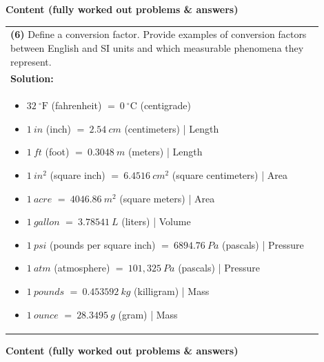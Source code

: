 \documentclass{article}
\begin{document}
\newpage
\noindent
{\large \textbf{Content (fully worked out problems \& answers)}} \\[0.2em]

\begin{tabular}{|p{0.9\linewidth}|}
\hline
\textbf{(6)} Define a conversion factor. Provide examples of conversion factors between English and SI units and which measurable phenomena they represent. \\
\textbf{Solution:} \\
\begin{itemize}
    \item $32~^\circ\mathrm{F}$ (fahrenheit) $=~0~^\circ\mathrm{C}$ (centigrade)
    \item $1~in$ (inch) $=~2.54~cm$ (centimeters) | Length
    \item $1~ft$ (foot) $=~0.3048~m$ (meters) | Length
    \item $1~in^2$ (square inch) $=~6.4516~cm^2$ (square centimeters) | Area
    \item $1~acre$ $=~4046.86~m^2$ (square meters) | Area
    \item $1~gallon$ $=~3.78541~L$ (liters) | Volume
    \item $1~psi$ (pounds per square inch) $=~6894.76~Pa$ (pascals) | Pressure
    \item $1~atm$ (atmosphere) $=~101,325~Pa$ (pascals) | Pressure
    \item $1~pounds$ $=~0.453592~kg$ (killigram) | Mass
    \item $1~ounce$ $=~28.3495~g$ (gram) | Mass
\end{itemize} \\
\hline
\end{tabular}
\newpage


\noindent
{\large \textbf{Content (fully worked out problems \& answers)}} \\[0.2em]
\end{document}
